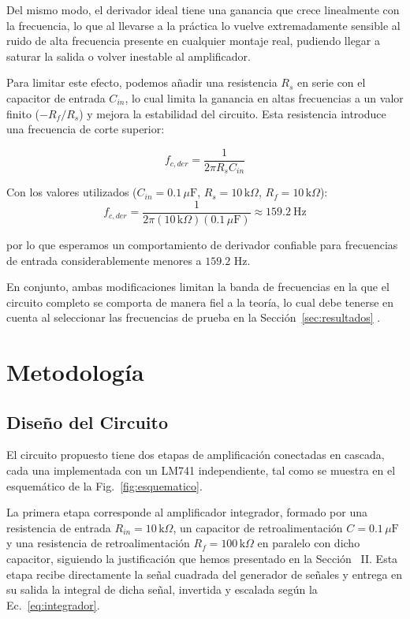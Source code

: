 \documentclass[conference]{IEEEtran}
\begin{document}
Del mismo modo, el derivador ideal tiene una ganancia que crece linealmente con la frecuencia, lo que al llevarse a la práctica lo vuelve extremadamente sensible al ruido de alta frecuencia presente en cualquier montaje real, pudiendo llegar a saturar la salida o volver inestable al amplificador.

Para limitar este efecto, podemos añadir una resistencia $R_s$ en serie con el capacitor de entrada $C_{in}$, lo cual limita la ganancia en altas frecuencias a un valor finito ($-R_f/R_s$) y mejora la estabilidad del circuito. Esta resistencia introduce una frecuencia de corte superior:

\begin{equation}
f_{c,der} = \frac{1}{2\pi R_s C_{in}}
\label{eq:fc_der}
\end{equation}

Con los valores utilizados ($C_{in}=0.1\,\mu\text{F}$, $R_s=10\,\text{k}\Omega$, $R_f=10\,\text{k}\Omega$):
\begin{equation}
f_{c,der} = \frac{1}{2\pi (10\,\text{k}\Omega)(0.1\,\mu\text{F})} \approx 159.2\ \text{Hz}
\label{eq:fc_der_valor}
\end{equation}

por lo que esperamos un comportamiento de derivador confiable para frecuencias de entrada considerablemente menores a $159.2$ Hz.

En conjunto, ambas modificaciones limitan la banda de frecuencias en la que el circuito completo se comporta de manera fiel a la teoría, lo cual debe tenerse en cuenta al seleccionar las frecuencias de prueba en la Sección~\ref{sec:resultados} \cite{b1,b2}.

\section{Metodología}

\subsection{Diseño del Circuito}
El circuito propuesto tiene dos etapas de amplificación conectadas en cascada, cada una implementada con un LM741 independiente, tal como se muestra en el esquemático de la Fig.~\ref{fig:esquematico}.

La primera etapa corresponde al amplificador integrador, formado por una resistencia de entrada $R_{in}=10\,\text{k}\Omega$, un capacitor de retroalimentación $C=0.1\,\mu\text{F}$ y una resistencia de retroalimentación $R_f=100\,\text{k}\Omega$ en paralelo con dicho capacitor, siguiendo la justificación que hemos presentado en la Sección ~II. Esta etapa recibe directamente la señal cuadrada del generador de señales y entrega en su salida la integral de dicha señal, invertida y escalada según la Ec.~\eqref{eq:integrador}.
\end{document}
